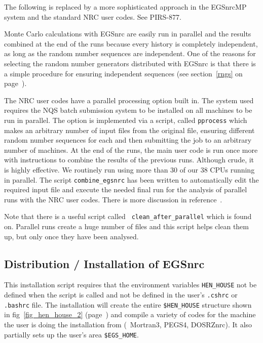 The following is replaced by a more sophisticated approach in the EGSnrcMP
system and the standard NRC user codes. See PIRS-877\cite{Ka03}.

Monte Carlo calculations with EGSnrc are easily run in parallel and the
results combined at the end of the runs because every history is completely
independent, as long as the random number sequences are independent. One of
the reasons for selecting the random number generators distributed with
EGSnrc is that there is a simple procedure for ensuring independent
sequences (see section~\ref{rngs} on page~\pageref{rngs}).

The NRC user codes\cite{Ro00} have a parallel processing option built in.
The system used requires the NQS batch submission system to be installed on
all machines to be run in parallel. The option is implemented via a script,
called {\tt pprocess} which makes an arbitrary number of input files from
the original file, ensuring different random number sequences for each and
then submitting the job to an arbitrary number of machines.  At the end of
the runs, the main user code is run once more with instructions to combine
the results of the previous runs.  Although crude, it is highly effective.
We routinely run using more than 30 of our 38 CPUs running in parallel.
The script {\tt combine\_egsnrc} has been written to automatically edit the
required input file and execute the needed final run for the analysis of
parallel runs with the NRC user codes.
There is more discussion in reference~\cite{Ro00}.

Note that there is a useful script called {\tt
clean\_after\_parallel} which is found on.
Parallel runs create a huge number of files and this script helps clean
them up, but only once they have been analysed.


\subsection{Distribution / Installation of EGSnrc}
\label{install}


This installation script requires that the environment variables
\verb+HEN_HOUSE+ not be defined when the script is called and not be
defined in the user's {\tt .cshrc} or {\tt .bashrc} file. The installation will create
the entire \verb+$HEN_HOUSE+ structure shown in
fig~\ref{fig_hen_house_2} (page~\pageref{fig_hen_house_2})
and compile a variety of codes for the machine
the user is doing the installation from (\viz\ Mortran3,
PEGS4, DOSRZnrc).  It also partially sets up the user's area
\verb+$EGS_HOME+.

